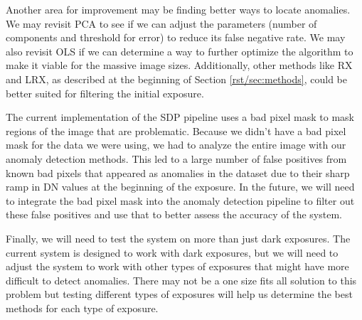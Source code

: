 Another area for improvement may be finding better ways to locate anomalies.
We may revisit PCA to see if we can adjust the parameters (number of components and threshold for error) to reduce its false negative rate.
We may also revisit OLS if we can determine a way to further optimize the algorithm to make it viable for the massive image sizes. 
Additionally, other methods like RX and LRX, as described at the beginning of Section \ref{rst/sec:methods}, could be better suited for filtering the initial exposure.

The current implementation of the SDP pipeline uses a bad pixel mask to mask regions of the image that are problematic. 
Because we didn't have a bad pixel mask for the data we were using, we had to analyze the entire image with our anomaly detection methods.
This led to a large number of false positives from known bad pixels that appeared as anomalies in the dataset due to their sharp ramp in DN values at the beginning of the exposure.
In the future, we will need to integrate the bad pixel mask into the anomaly detection pipeline to filter out these false positives and use that to better assess the accuracy of the system. 

Finally, we will need to test the system on more than just dark exposures.
The current system is designed to work with dark exposures, but we will need to adjust the system to work with other types of exposures that might have more difficult to detect anomalies.
There may not be a one size fits all solution to this problem but testing different types of exposures will help us determine the best methods for each type of exposure.